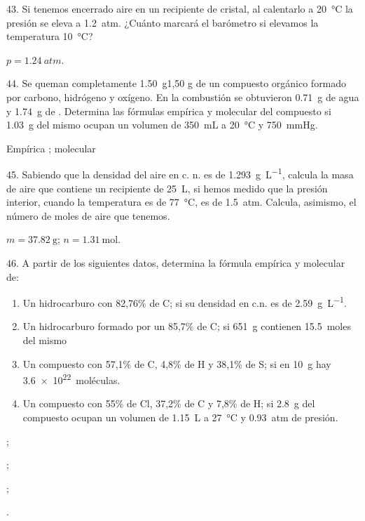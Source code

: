 \documentclass[11pt]{article}
\begin{document}
\begin{multicols}{2}
\begin{exercise}
  43. Si tenemos encerrado aire en un recipiente de cristal, al
  calentarlo a \SI{20}{\celsius} la presión se eleva a \SI{1.2}{atm}. ¿Cuánto marcará el barómetro si elevamos la temperatura \SI{10}{\celsius}?
\end{exercise}
\begin{solution}
  $p = \SI{1.24}{atm}$.
\end{solution}

\begin{exercise}
  44. Se queman completamente \SI{1.50}{\gram}1,50 g de un compuesto orgánico
  formado por carbono, hidrógeno y oxígeno. En la combustión
  se obtuvieron \SI{0.71}{\gram} de agua y \SI{1.74}{\gram} de . Determina las fórmulas empírica y molecular del compuesto si
  \SI{1.03}{\gram} del mismo ocupan un volumen de \SI{350}{\milli\liter} a \SI{20}{\celsius} y \SI{750}{\mmHg}.
\end{exercise}
\begin{solution}
  Empírica ; molecular 
\end{solution}

\begin{exercise}
  45. Sabiendo que la densidad del aire en c. n. es de \SI{1.293}{\gram\per\liter}, calcula la masa de aire que contiene un recipiente de \SI{25}{\liter}, si
  hemos medido que la presión interior, cuando la temperatura
  es de \SI{77}{\celsius}, es de \SI{1.5}{atm}. Calcula, asimismo, el número de
  moles de aire que tenemos.
\end{exercise}
\begin{solution}
  $m = \SI{37.82}{\gram}$; $n = \SI{1.31}{\mole}$.
\end{solution}

\begin{exercise}
46. A partir de los siguientes datos, determina la fórmula empírica y molecular de:
\begin{enumerate}
  \item Un hidrocarburo con 82,76\% de C; si su densidad en c.n. es de \SI{2.59}{\gram\per\liter}.
  \item Un hidrocarburo formado por un 85,7\% de C; si \SI{651}{\gram} contienen \SI{15.5}{moles} del mismo
  \item Un compuesto con 57,1\% de C, 4,8\% de H y 38,1\% de S; si en \SI{10}{\gram} hay \SI{3.6e22}{moléculas}.
  \item Un compuesto con 55\% de Cl, 37,2\% de C y 7,8\% de H; si \SI{2.8}{\gram} del compuesto ocupan un volumen de \SI{1.15}{\liter} a \SI{27}{\celsius} y \SI{0.93}{atm} de presión.
\end{enumerate}
\end{exercise}
\begin{solution}
  \begin{enumerate*}
    \item {};
    \item {};
    \item {};
    \item {}.
  \end{enumerate*}
\end{solution}


\end{multicols}
\end{document}
